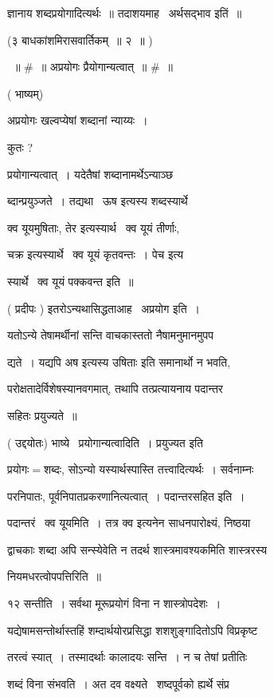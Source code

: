\documentclass[11pt, openany]{book}
\begin{document}
ज्ञानाय शब्दप्रयोगादित्यर्थः~॥ तदाशयमाह \textendash\ अर्थसद्भाव इतिं~॥ 

(३ बाधकांशमिरासवार्तिकम्~॥ २~॥ ) 

~॥ \#~॥ अप्रयोगः प्रैयोगान्यत्वात्~॥ \#~॥ 

( भाष्यम्) 

अप्रयोगः खल्वप्येषां शब्दानां न्याय्यः~। 

कुतः ? 

{\qt प्रयोगान्यत्वात्}~। यदेतैषां शब्दानामर्थेऽन्याञ्छ \textendash\ 

ब्दान्प्रयुञ्जते~। तद्यथा \textendash\ {\qt ऊष} इत्यस्य शब्दस्यार्थे \textendash\ 

क्व यूयमुषिताः, {\qt तेर} इत्यस्यार्थ \textendash\ क्व यूयं तीर्णाः, 

{\qt चक्र इत्यस्यार्थे \textendash\ क्व यूयं कृतवन्तः~। पेच} इत्य \textendash\ 

स्यार्थे \textendash\ क्व यूयं पक्कवन्त इति~॥ 

( प्रदीपः ) इतरोऽन्यथासिद्धताआह \textendash\ अप्रयोग इति~। 

यतोऽन्ये तेषामर्थीनां सन्ति वाचकास्ततो नैषामनुमानमुपप \textendash\ 

द्यते~। यद्यपि {\qt अष} इत्यस्य {\qt उषिताः} इति समानार्थो न भवति, 

परोक्षतादेर्विशेषस्यानवगमात्, तथापि तत्प्रत्यायनाय पदान्तर \textendash\ 

सहितः प्रयुज्यते~॥ 

( उद्दयोतः) भाष्ये \textendash\ प्रयोगान्यत्वादिति~। प्रयुज्यत इति \textendash\ 

प्रयोगः$=$शब्दः, सोऽन्यो यस्यार्थस्पास्ति तत्त्वादित्यर्थः~। सर्वनाम्नः 

परनिपातः, पूर्वनिपातप्रकरणानित्यत्वात्~। पदान्तरसहित इति~। 

पदान्तरं \textendash\ क्व यूयमिति~। तत्र {\qt क्व} इत्यनेन साधनपारोक्ष्यं, निष्ठया 



द्वाचकाः शब्दा अपि सन्स्येवेति न तदर्थ शास्त्रमावश्यकमिति शास्त्ररस्य 

नियमधरत्वोपपत्तिरिति~॥ 

१२ सन्तीति~। सर्वथा मूरूप्रयोगं विना न शास्त्रोपदेशः~। 

यद्येषामसन्तोर्थास्तहिं शम्दार्थयोरप्रसिद्धा शशशुङ्गादितोऽपि
विप्रकृष्ट \textendash\ 

तरत्वं स्यात्~। तस्मादर्थाः कालादयः सन्ति~। न च तेषां प्रतीतिः 

शब्दं विना संभवति~। अत दव वक्ष्यते \textendash\ शष्दपूर्वको ह्यर्थे संप्र \textendash\ 
\end{document}
